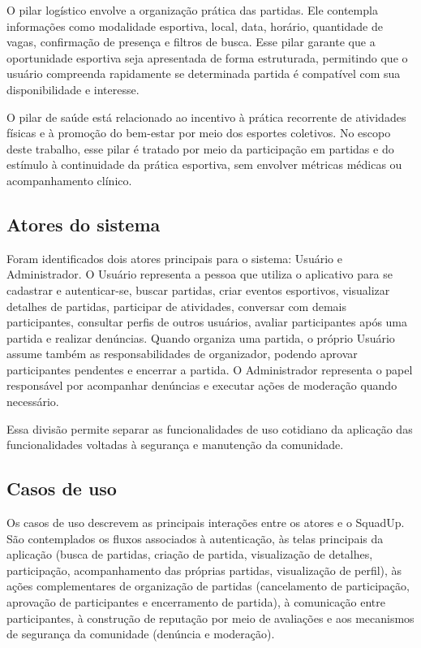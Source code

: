 \documentclass[a4paper, 12pt]{article}
\begin{document}
\begin{justify}
O pilar logístico envolve a organização prática das partidas. Ele contempla informações como modalidade esportiva, local, data, horário, quantidade de vagas, confirmação de presença e filtros de busca. Esse pilar garante que a oportunidade esportiva seja apresentada de forma estruturada, permitindo que o usuário compreenda rapidamente se determinada partida é compatível com sua disponibilidade e interesse.

O pilar de saúde está relacionado ao incentivo à prática recorrente de atividades físicas e à promoção do bem-estar por meio dos esportes coletivos. No escopo deste trabalho, esse pilar é tratado por meio da participação em partidas e do estímulo à continuidade da prática esportiva, sem envolver métricas médicas ou acompanhamento clínico.

\subsection{Atores do sistema}

Foram identificados dois atores principais para o sistema: Usuário e Administrador. O Usuário representa a pessoa que utiliza o aplicativo para se cadastrar e autenticar-se, buscar partidas, criar eventos esportivos, visualizar detalhes de partidas, participar de atividades, conversar com demais participantes, consultar perfis de outros usuários, avaliar participantes após uma partida e realizar denúncias. Quando organiza uma partida, o próprio Usuário assume também as responsabilidades de organizador, podendo aprovar participantes pendentes e encerrar a partida. O Administrador representa o papel responsável por acompanhar denúncias e executar ações de moderação quando necessário.

Essa divisão permite separar as funcionalidades de uso cotidiano da aplicação das funcionalidades voltadas à segurança e manutenção da comunidade.

\subsection{Casos de uso}

Os casos de uso descrevem as principais interações entre os atores e o SquadUp. São contemplados os fluxos associados à autenticação, às telas principais da aplicação (busca de partidas, criação de partida, visualização de detalhes, participação, acompanhamento das próprias partidas, visualização de perfil), às ações complementares de organização de partidas (cancelamento de participação, aprovação de participantes e encerramento de partida), à comunicação entre participantes, à construção de reputação por meio de avaliações e aos mecanismos de segurança da comunidade (denúncia e moderação).


\end{justify}
\end{document}

